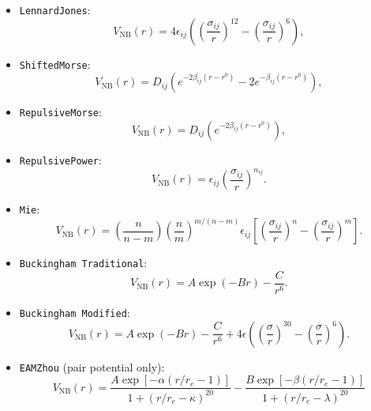 \documentclass[]{book}
\begin{document}
\begin{itemize}
\item {\tt LennardJones}:
\begin{equation*}
V_{\text{NB}}(r) = 4 \epsilon_{ij} \left(
  \left(\frac{\sigma_{ij}}{r} \right)^{12} -
  \left(\frac{\sigma_{ij}}{r} \right)^{6} \right),
\end{equation*}
\item {\tt ShiftedMorse}:
\begin{equation*}
 V_{\text{NB}}(r) = D_{ij} \left( e^{-2 \beta_{ij} (r -
     r^0)} - 2 e^{- \beta_{ij} (r -
     r^0)} \right),
\end{equation*}
\item {\tt RepulsiveMorse}:
\begin{equation*}
 V_{\text{NB}}(r) = D_{ij} \left( e^{-2 \beta_{ij} (r -
     r^0)} \right),
\end{equation*}
\item {\tt RepulsivePower}:
\begin{equation*}
  V_{\text{NB}}(r) = \epsilon_{ij}
  \left(\frac{\sigma_{ij}}{r} \right)^{n_{ij}}.
\end{equation*}
\item {\tt Mie}:
\begin{equation*}
  V_{\text{NB}}(r) =  \left(\frac{n}{n-m}\right)
  \left(\frac{n}{m}\right)^{m/(n-m)} \epsilon_{ij} \left[
  \left(\frac{\sigma_{ij}}{r} \right)^{n} -
  \left(\frac{\sigma_{ij}}{r} \right)^{m} \right].
\end{equation*}
\item {\tt Buckingham Traditional}:
\begin{equation*}
  V_{\text{NB}}(r) =  A \exp( -B r) - \frac{C}{r^6}.
\end{equation*}
\item {\tt Buckingham Modified}:
\begin{equation*}
  V_{\text{NB}}(r) = A \exp( -B r) - \frac{C}{r^6} + 4 \epsilon \left( \left( \frac{\sigma}{r} \right)^30 - \left( \frac{\sigma}{r} \right)^6 \right).
\end{equation*}
\item {\tt EAMZhou} (pair potential only):
\begin{equation*}
  V_{\text{NB}}(r) = \frac{ A \exp\left[-\alpha (r/r_e -1)\right]}{1+(r/r_e - \kappa)^{20}} -  \frac{ B \exp\left[-\beta (r/r_e -1)\right]}{1+(r/r_e - \lambda)^{20}}
\end{equation*}

\end{itemize}
\end{document}
